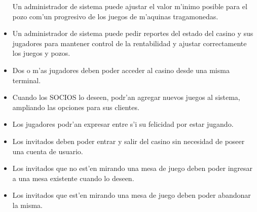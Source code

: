 \begin{itemize}
 Un administrador de sistema puede ajustar el valor m'inimo posible para el pozo com'un progresivo de los juegos de m'aquinas tragamonedas.

\item {} 

 Un administrador de sistema puede pedir reportes del estado del casino y sus jugadores para mantener control de la rentabilidad y ajustar correctamente los juegos y pozos.

\item {} 

 Dos o m'as jugadores deben poder acceder al casino desde una misma terminal.

\item {} 

 Cuando los SOCIOS lo deseen, podr'an agregar nuevos juegos al sistema, ampliando las opciones para sus clientes.

\end{itemize}

\clearpage


\begin{itemize}

\item  {} 

 Los jugadores podr'an expresar entre s'i su felicidad por estar jugando.

\item  {} 

 Los invitados deben poder entrar y salir del casino sin necesidad de poseer una cuenta de usuario.

\item  {}

 Los invitados que no est'en mirando una mesa de juego deben poder ingresar a una mesa existente cuando lo deseen.

\item  {}

 Los invitados que est'en mirando una mesa de juego deben poder abandonar la misma.

\end{itemize}



